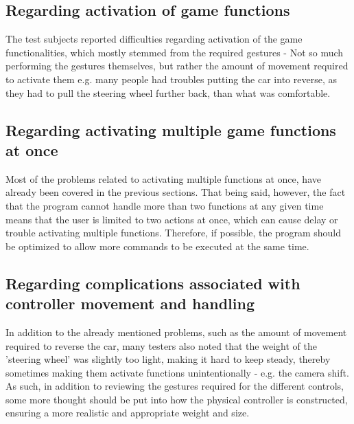 \subsection{Regarding activation of game functions}
The test subjects reported difficulties regarding activation of the game functionalities, which mostly stemmed from the required gestures - Not so much performing the gestures themselves, but rather the amount of movement required to activate them e.g. many people had troubles putting the car into reverse, as they had to pull the steering wheel further back, than what was comfortable.

\subsection{Regarding activating multiple game functions at once}
Most of the problems related to activating multiple functions at once, have already been covered in the previous sections. That being said, however, the fact that the program cannot handle more than two functions at any given time means that the user is limited to two actions at once, which can cause delay or trouble activating multiple functions. Therefore, if possible, the program should be optimized to allow more commands to be executed at the same time.

\subsection{Regarding complications associated with controller movement and handling}
In addition to the already mentioned problems, such as the amount of movement required to reverse the car, many testers also noted that the weight of the 'steering wheel' was slightly too light, making it hard to keep steady, thereby sometimes making them activate functions unintentionally - e.g. the camera shift.
As such, in addition to reviewing the gestures required for the different controls, some more thought should be put into how the physical controller is constructed, ensuring a more realistic and appropriate weight and size.
